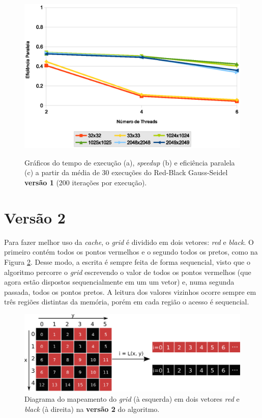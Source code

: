 \begin{figure}[H]
    \begin{minipage}{.5\textwidth}
        \includegraphics[width=\textwidth]{figures/efficiency-v1}
        \label{subfig:efficiency-v1}
    \end{minipage}%

    \caption{Gráficos do tempo de execução (a), \textit{speedup} (b) e eficiência paralela (c) a partir da média de 30 execuções do Red-Black Gauss-Seidel \textbf{versão 1} (200 iterações por execução).}
    \label{fig:perf-v1}
\end{figure}

\section{Versão 2}
\label{sec:gs-version2}

Para fazer melhor uso da \textit{cache}, o \textit{grid} é dividido em dois vetores: \textit{red} e \textit{black}. O primeiro contém todos os pontos vermelhos e o segundo todos os pretos, como na Figura \ref{fig:grid-v2}. Desse modo, a escrita é sempre feita de forma sequencial, visto que o algoritmo percorre o \textit{grid} escrevendo o valor de todos os pontos vermelhos (que agora estão dispostos sequencialmente em um um vetor) e, numa segunda passada, todos os pontos pretos.  A leitura dos valores vizinhos ocorre sempre em três regiões distintas da memória, porém em cada região o acesso é sequencial.

\begin{figure}[h]
    \centering
    \includegraphics[width=.8\textwidth]{figures/grid-v2}

    \caption{Diagrama do mapeamento do \textit{grid} (à esquerda) em dois vetores \textit{red} e \textit{black} (à direita) na \textbf{versão 2} do algoritmo.}
    \label{fig:grid-v2}
\end{figure}

